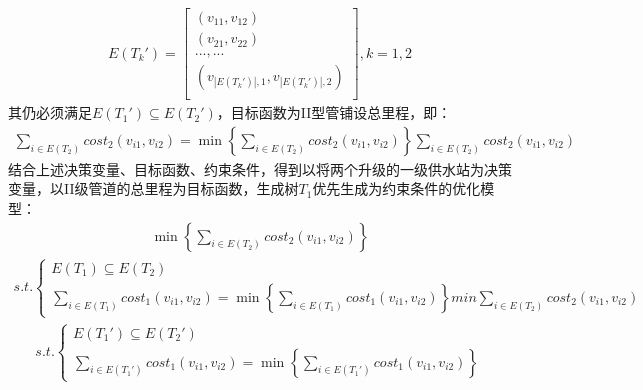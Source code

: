 \documentclass{whutmod}
\begin{document}
			\begin{gather}
			E(T_k')=
		\begin{bmatrix}
		(v_{11} ,v_{12}) \\ 
		(v_{21} ,v_{22} )\\ 
		...,...\\
		(v_{|E(T_k')|,1},v_{|E(T_k')|,2})\\
		\end{bmatrix},k=1,2
			\end{gather}
			其仍必须满足$E(T_1')\subseteq E(T_2')$，目标函数为II型管铺设总里程，即：
			\begin{gather}
			\displaystyle \sum_{i\in E(T_2) }cost_2(v_{i1},v_{i2})=\min\left \{\displaystyle \sum_{i\in E(T_2) }cost_2(v_{i1},v_{i2})\right\}
			\displaystyle \sum_{i\in E(T_2) }cost_2(v_{i1},v_{i2})
			\end{gather}
			结合上述决策变量、目标函数、约束条件，得到以将两个升级的一级供水站为决策变量，以II级管道的总里程为目标函数，生成树$T_1$优先生成为约束条件的优化模型：
			\begin{gather}
			\min \left\{ \sum_{i\in E(T_2) }cost_2(v_{i1},v_{i2}) \right \}
			\end{gather}
			\begin{gather*}
			s.t.\left\{\begin{matrix}
			E(T_{1})\subseteq  E(T_{2})\\ 
			\displaystyle\sum_{i\in E(T_1) }cost_1(v_{i1},v_{i2})=\min\left \{ 	\displaystyle\sum_{i\in E(T_1) }cost_1(v_{i1},v_{i2}) \right \} 
			min  \sum_{i\in E(T_2) }cost_2(v_{i1},v_{i2})
			\end{matrix}\right.
			\end{gather*}
			\begin{gather*}
			s.t.\left\{\begin{matrix}
			E(T_{1}')\subseteq  E(T_{2}')\\ 
			\displaystyle\sum_{i\in E(T_1') }cost_1(v_{i1},v_{i2})=\min\left \{ 	\displaystyle \sum_{i\in E(T_1') }cost_1(v_{i1},v_{i2}) \right \} 
			\end{matrix}\right.
			\end{gather*}
\end{document}
